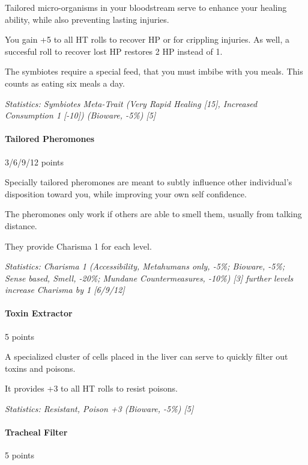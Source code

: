\begin{multicols*}{3}
	Tailored micro-organisms in your bloodstream serve to enhance your healing ability, while also preventing lasting injuries.
	
	You gain +5 to all HT rolls to recover HP or for crippling injuries. As well, a succesful roll to recover lost HP restores 2 HP instead of 1.
	
	The symbiotes require a special feed, that you must imbibe with you meals. This counts as eating six meals a day.
	
	\textit{\textcolor{OliveGreen}{Statistics: Symbiotes Meta-Trait (Very Rapid Healing [15], Increased Consumption 1 [-10]) (Bioware, -5\%) [5]}}
	
	\paragraph{Tailored Pheromones}
	\begin{flushright}
		3/6/9/12 points
	\end{flushright}
	
	Specially tailored pheromones are meant to subtly influence other individual's disposition toward you, while improving your own self confidence. 
	
	The pheromones only work if others are able to smell them, usually from talking distance. 
	
	They provide Charisma 1 for each level.
	
	\textit{\textcolor{OliveGreen}{Statistics: Charisma 1 (Accessibility, Metahumans only, -5\%; Bioware, -5\%; Sense based, Smell, -20\%; Mundane Countermeasures, -10\%) [3] further levels increase Charisma by 1 [6/9/12]}}
	
	\paragraph{Toxin Extractor}
	\begin{flushright}
		5 points
	\end{flushright}
	
	A specialized cluster of cells placed in the liver can serve to quickly filter out toxins and poisons.
	
	It provides +3 to all HT rolls to resist poisons.
	
	\textit{\textcolor{OliveGreen}{Statistics: Resistant, Poison +3 (Bioware, -5\%) [5]}}
	
	\paragraph{Tracheal Filter}
	\begin{flushright}
		5 points
	\end{flushright}
	

\end{multicols*}
